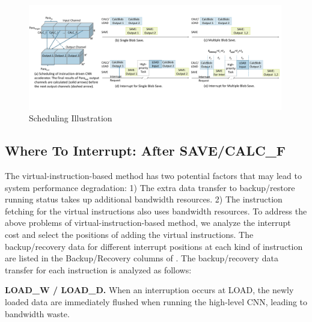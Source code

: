 






\begin{figure}[t]
    \centering
	\includegraphics[width=0.99\textwidth]{fig/singlesave.pdf} 	
    \caption{
		Scheduling Illustration
    }
	\label{fig:singlesave}
\end{figure}



\subsection{ Where To Interrupt: After SAVE/CALC\_F }
\label{sec:whereinter}
The virtual-instruction-based method has two potential factors that may lead to system performance degradation: 1) The extra data transfer to backup/restore running status takes up additional bandwidth resources. 2) The instruction fetching for the virtual instructions also uses bandwidth resources.
To address the above problems of virtual-instruction-based method, we analyze the interrupt cost and select the positions of adding the virtual instructions.
The backup/recovery data for different interrupt positions at each kind of instruction are listed in the Backup/Recovery columns of . The backup/recovery data transfer for each instruction is analyzed as follows:

\textbf{LOAD\_W / LOAD\_D. }
When an interruption occurs at LOAD, the newly loaded data are immediately flushed when running the high-level CNN, leading to bandwidth waste.

